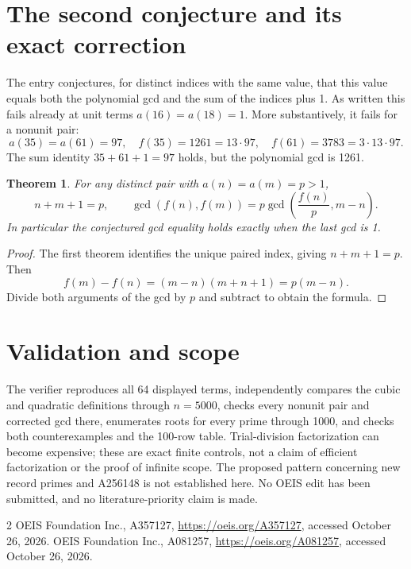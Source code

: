 \documentclass[10pt]{article}
\newtheorem{theorem}{Theorem}
\begin{document}
\section{The second conjecture and its exact correction}
The entry conjectures, for distinct indices with the same value, that this value equals both the polynomial gcd and the sum of the indices plus 1. As written this fails already at unit terms $a(16)=a(18)=1$. More substantively, it fails for a nonunit pair:
\[
 a(35)=a(61)=97,\quad f(35)=1261=13\cdot97,\quad
 f(61)=3783=3\cdot13\cdot97.
\]
The sum identity $35+61+1=97$ holds, but the polynomial gcd is 1261.
\begin{theorem}
For any distinct pair with $a(n)=a(m)=p>1$,
\[
 n+m+1=p,\qquad
 \gcd(f(n),f(m))=p\gcd\left(\frac{f(n)}p,m-n\right).
\]
In particular the conjectured gcd equality holds exactly when the last gcd is 1.
\end{theorem}
\begin{proof}
The first theorem identifies the unique paired index, giving $n+m+1=p$. Then
\[
 f(m)-f(n)=(m-n)(m+n+1)=p(m-n).
\]
Divide both arguments of the gcd by $p$ and subtract to obtain the formula.
\end{proof}
\section{Validation and scope}
The verifier reproduces all 64 displayed terms, independently compares the cubic and quadratic definitions through $n=5000$, checks every nonunit pair and corrected gcd there, enumerates roots for every prime through 1000, and checks both counterexamples and the 100-row table. Trial-division factorization can become expensive; these are exact finite controls, not a claim of efficient factorization or the proof of infinite scope. The proposed pattern concerning new record primes and A256148 is not established here. No OEIS edit has been submitted, and no literature-priority claim is made.
\begin{thebibliography}{2}
 OEIS Foundation Inc., A357127, \url{https://oeis.org/A357127}, accessed October 26, 2026.
 OEIS Foundation Inc., A081257, \url{https://oeis.org/A081257}, accessed October 26, 2026.
\end{thebibliography}
\end{document}
